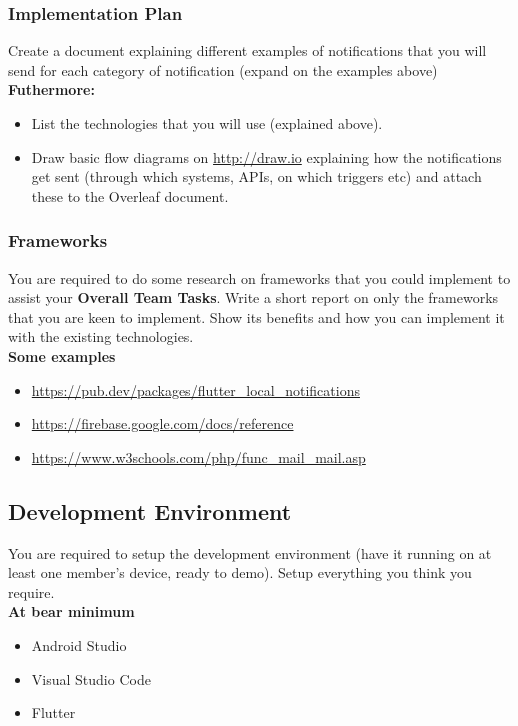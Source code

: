 \documentclass{article}
\begin{document}
\subsubsection{Implementation Plan}
Create a document explaining different examples of notifications that you will send for each category of notification (expand on the examples above) \\

\textbf{Futhermore:}
\begin{itemize}
    \item List the technologies that you will use (explained above).
    \item Draw basic flow diagrams on \url{http://draw.io} explaining how the notifications get sent (through which systems, APIs, on which triggers etc) and attach these to the Overleaf document.
\end{itemize}

\subsubsection{Frameworks}
You are required to do some research on frameworks that you could implement to assist your \textbf{Overall Team Tasks}. Write a short report on only the frameworks that you are keen to implement. Show its benefits and how you can implement it with the existing technologies. \\

\textbf{Some examples}
\begin{itemize}
    \item \url{https://pub.dev/packages/flutter_local_notifications}
    \item \url{https://firebase.google.com/docs/reference}
    \item \url{https://www.w3schools.com/php/func_mail_mail.asp}
\end{itemize}

\subsection{Development Environment}
You are required to setup the development environment (have it running on at least one member's device, ready to demo). Setup everything you think you require. \\
\newline
\textbf{At bear minimum}
\begin{itemize}
    \item Android Studio
    \item Visual Studio Code
    \item Flutter
\end{itemize}
\end{document}
